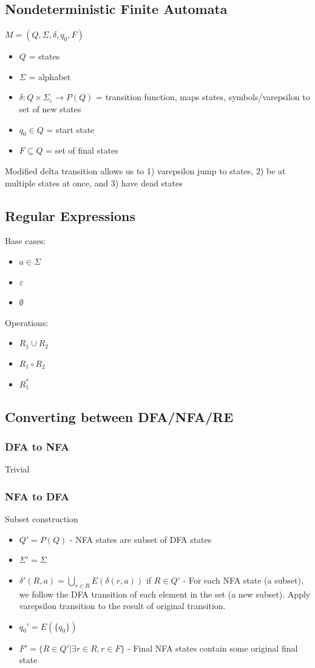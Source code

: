 \documentclass{article}
\begin{document}
\subsection{Nondeterministic Finite Automata}
$M = (Q, \Sigma, \delta, q_0, F)$
\begin{itemize}
    \item $Q$ = states
    \item $\Sigma$ = alphabet
    \item $\delta : Q \times \Sigma_{\varepsilon} \rightarrow P(Q)$ = transition function, maps states, symbols/varepsilon to set of new states
    \item $q_0 \in Q$ = start state
    \item $F \subseteq Q$ = set of final states
\end{itemize}
Modified delta transition allows us to 1) varepsilon jump to states, 2) be at multiple states at once, and 3) have dead states

\subsection{Regular Expressions}
Base cases:
\begin{itemize}
    \item $a \in \Sigma$
    \item $\varepsilon$
    \item $\emptyset$
\end{itemize}
Operations:
\begin{itemize}
    \item $R_1 \cup R_2$
    \item $R_1 \circ R_2$
    \item $R_1^*$
\end{itemize}

\subsection{Converting between DFA/NFA/RE}

\subsubsection{DFA to NFA}
Trivial

\subsubsection{NFA to DFA}
Subset construction
\begin{itemize}
    \item $Q' = P(Q)$ - NFA states are subset of DFA states
    \item $\Sigma' = \Sigma$
    \item $\delta'(R, a) = \bigcup_{r \in R} E(\delta(r, a))$ if $R \in Q'$ - For each NFA state (a subset), we follow the DFA transition of each element in the set (a new subset). Apply varepsilon transition to the result of original transition.
    \item $q_0' = E(\{q_0\})$
    \item $F' = \{R \in Q' | \exists r \in R, r \in F\}$ - Final NFA states contain some original final state
\end{itemize}
\end{document}

